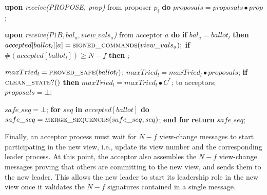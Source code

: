 \begin{algorithm}
\begin{multicols}{2}
\begin{algorithmic}[1]
			\State
			\State \textbf{upon} \textit{receive(PROPOSE, prop)} from proposer $p_i$ \textbf{do} 
			\State \hspace{\algorithmicindent} $proposals = proposals \bullet prop$;

			\State \textbf{upon} \textit{receive($P1B, bal_a,view\_vals_a$)} from acceptor $a$ \textbf{do}
			\State \hspace{\algorithmicindent} \textbf{if} $bal_a = ballot_l$ \textbf{then}
			\State \hspace{\algorithmicindent}\hspace{\algorithmicindent} $accepted[ballot_l][a] = \Call{signed\_commands}{view\_vals_a};$
			\State \hspace{\algorithmicindent}\hspace{\algorithmicindent} \textbf{if} $\#(accepted[ballot_l]) \geq N-f$ \textbf{then} 
			\State \hspace{\algorithmicindent}\hspace{\algorithmicindent}\hspace{\algorithmicindent} ;
			
			\State
			\State $maxTried_l = \Call{proved\_safe}{ballot_l}$;
			\State $maxTried_l = maxTried_l \bullet proposals$;
			\State \textbf{if} $\Call{clean\_state?}{ }$ \textbf{then}
			\State \hspace{\algorithmicindent} $maxTried_l = maxTried_l \bullet C^*$;
			\State {} to acceptors;
			\State $proposals = \bot$;
			\EndFunction
			
			\State
			\State $safe\_seq = \bot$;
			\State \textbf{for} $seq$ \textbf{in} $accepted[ballot]$ \textbf{do}
			\State \hspace{\algorithmicindent} $safe\_seq = \Call{merge\_sequences}{safe\_seq, seq}$;
			\State \textbf{end for}
			\State \textbf{return} $safe\_seq$;
			\EndFunction		
		\end{algorithmic}
	\end{multicols}
	\vspace*{-.4cm}
\end{algorithm}

Finally, an acceptor process must wait for $N-f$ view-change messages to start participating in the new view, i.e., update its view number and the corresponding leader process. At this point, the acceptor also assembles the $N-f$ view-change messages proving that others are committing to the new view, and sends them to the new leader. This allows the new leader to start its leadership role in the new view once it validates the $N-f$ signatures contained in a single message.

